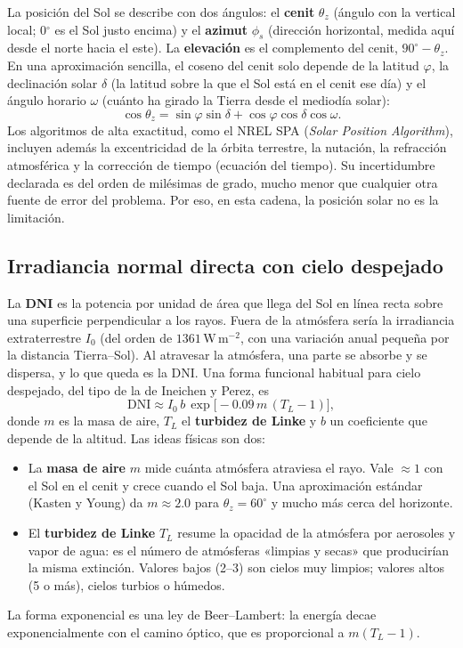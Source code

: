 \documentclass[11pt,a4paper]{article}
\begin{document}
La posición del Sol se describe con dos ángulos: el \textbf{cenit} $\theta_z$ (ángulo con la vertical local;
0$^\circ$ es el Sol justo encima) y el \textbf{azimut} $\phi_s$ (dirección horizontal, medida aquí desde el norte
hacia el este). La \textbf{elevación} es el complemento del cenit, $90^\circ-\theta_z$. En una aproximación
sencilla, el coseno del cenit solo depende de la latitud $\varphi$, la declinación solar $\delta$ (la latitud
sobre la que el Sol está en el cenit ese día) y el ángulo horario $\omega$ (cuánto ha girado la Tierra desde el
mediodía solar):
\begin{equation}
  \cos\theta_z=\sin\varphi\sin\delta+\cos\varphi\cos\delta\cos\omega .
  \label{eq:cenit}
\end{equation}
Los algoritmos de alta exactitud, como el NREL SPA (\emph{Solar Position Algorithm}), incluyen además la
excentricidad de la órbita terrestre, la nutación, la refracción atmosférica y la corrección de tiempo
(ecuación del tiempo). Su incertidumbre declarada es del orden de milésimas de grado, mucho menor que cualquier
otra fuente de error del problema. Por eso, en esta cadena, la posición solar no es la limitación.

\subsection{Irradiancia normal directa con cielo despejado}

La \textbf{DNI} es la potencia por unidad de área que llega del Sol en línea recta sobre una superficie
perpendicular a los rayos. Fuera de la atmósfera sería la irradiancia extraterrestre $I_0$ (del orden de
$1361$\,W\,m$^{-2}$, con una variación anual pequeña por la distancia Tierra--Sol). Al atravesar la atmósfera,
una parte se absorbe y se dispersa, y lo que queda es la DNI. Una forma funcional habitual para cielo despejado,
del tipo de la de Ineichen y Perez, es
\begin{equation}
  \mathrm{DNI}\approx I_0\,b\,\exp\!\bigl[-0.09\,m\,(T_L-1)\bigr],
  \label{eq:dni}
\end{equation}
donde $m$ es la masa de aire, $T_L$ el \textbf{turbidez de Linke} y $b$ un coeficiente que depende de la altitud.
Las ideas físicas son dos:
\begin{itemize}
  \item La \textbf{masa de aire} $m$ mide cuánta atmósfera atraviesa el rayo. Vale $\approx1$ con el Sol en el cenit
        y crece cuando el Sol baja. Una aproximación estándar (Kasten y Young) da $m\approx2.0$ para
        $\theta_z=60^\circ$ y mucho más cerca del horizonte.
  \item El \textbf{turbidez de Linke} $T_L$ resume la opacidad de la atmósfera por aerosoles y vapor de agua: es
        el número de atmósferas «limpias y secas» que producirían la misma extinción. Valores bajos (2--3)
        son cielos muy limpios; valores altos (5 o más), cielos turbios o húmedos.
\end{itemize}
La forma exponencial es una ley de Beer--Lambert: la energía decae exponencialmente con el camino óptico, que
es proporcional a $m(T_L-1)$.
\end{document}
